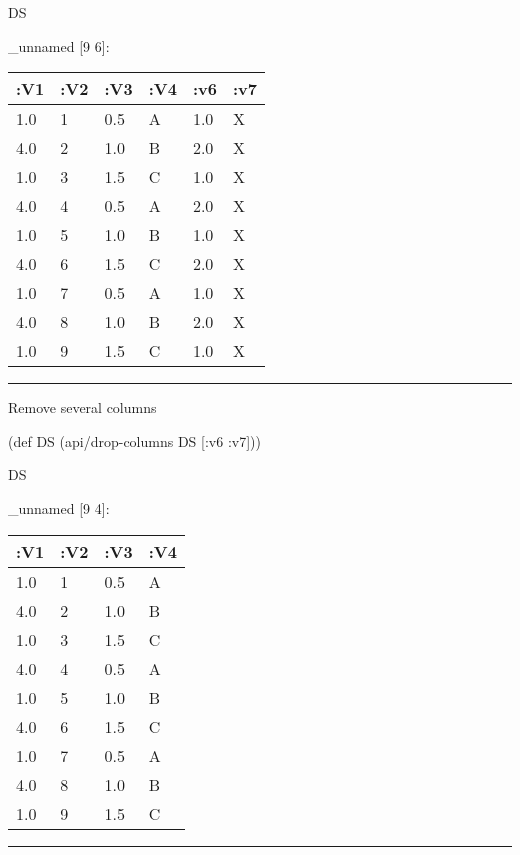 \documentclass[]{article}
\newenvironment{Shaded}{\begin{snugshade}}{\end{snugshade}}
\newcommand{\AttributeTok}[1]{\textcolor[rgb]{0.77,0.63,0.00}{#1}}
\newcommand{\BuiltInTok}[1]{#1}
\newcommand{\FunctionTok}[1]{\textcolor[rgb]{0.00,0.00,0.00}{#1}}
\newcommand{\NormalTok}[1]{#1}
\begin{document}
\begin{Shaded}
\begin{Highlighting}[]
\NormalTok{DS}
\end{Highlighting}
\end{Shaded}

\_unnamed {[}9 6{]}:

\begin{longtable}[]{@{}llllll@{}}
\toprule
:V1 & :V2 & :V3 & :V4 & :v6 & :v7\tabularnewline
\midrule
\endhead
1.0 & 1 & 0.5 & A & 1.0 & X\tabularnewline
4.0 & 2 & 1.0 & B & 2.0 & X\tabularnewline
1.0 & 3 & 1.5 & C & 1.0 & X\tabularnewline
4.0 & 4 & 0.5 & A & 2.0 & X\tabularnewline
1.0 & 5 & 1.0 & B & 1.0 & X\tabularnewline
4.0 & 6 & 1.5 & C & 2.0 & X\tabularnewline
1.0 & 7 & 0.5 & A & 1.0 & X\tabularnewline
4.0 & 8 & 1.0 & B & 2.0 & X\tabularnewline
1.0 & 9 & 1.5 & C & 1.0 & X\tabularnewline
\bottomrule
\end{longtable}

\begin{center}\rule{0.5\linewidth}{0.5pt}\end{center}

Remove several columns

\begin{Shaded}
\begin{Highlighting}[]
\NormalTok{(}\BuiltInTok{def}\FunctionTok{ DS }\NormalTok{(api/drop-columns DS [}\AttributeTok{:v6} \AttributeTok{:v7}\NormalTok{]))}
\end{Highlighting}
\end{Shaded}

\begin{Shaded}
\begin{Highlighting}[]
\NormalTok{DS}
\end{Highlighting}
\end{Shaded}

\_unnamed {[}9 4{]}:

\begin{longtable}[]{@{}llll@{}}
\toprule
:V1 & :V2 & :V3 & :V4\tabularnewline
\midrule
\endhead
1.0 & 1 & 0.5 & A\tabularnewline
4.0 & 2 & 1.0 & B\tabularnewline
1.0 & 3 & 1.5 & C\tabularnewline
4.0 & 4 & 0.5 & A\tabularnewline
1.0 & 5 & 1.0 & B\tabularnewline
4.0 & 6 & 1.5 & C\tabularnewline
1.0 & 7 & 0.5 & A\tabularnewline
4.0 & 8 & 1.0 & B\tabularnewline
1.0 & 9 & 1.5 & C\tabularnewline
\bottomrule
\end{longtable}

\begin{center}\rule{0.5\linewidth}{0.5pt}\end{center}
\end{document}
